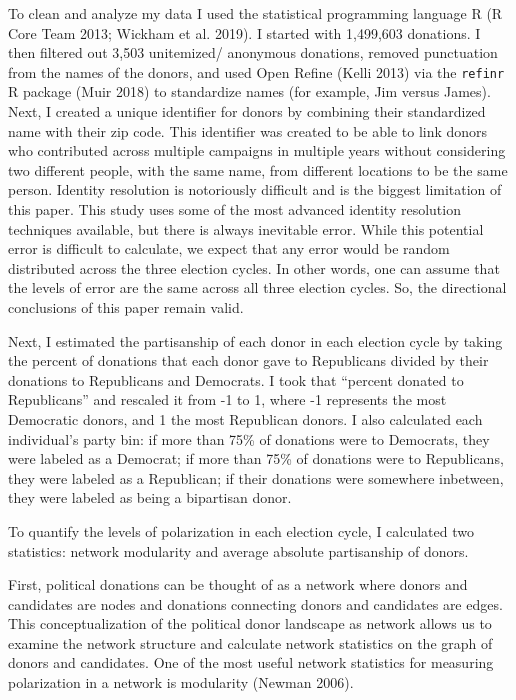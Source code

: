 \documentclass[12pt,]{article}
\begin{document}
To clean and analyze my data I used the statistical programming language
R (R Core Team 2013; Wickham et al. 2019). I started with 1,499,603
donations. I then filtered out 3,503 unitemized/ anonymous donations,
removed punctuation from the names of the donors, and used Open Refine
(Kelli 2013) via the \texttt{refinr} R package (Muir 2018) to
standardize names (for example, Jim versus James). Next, I created a
unique identifier for donors by combining their standardized name with
their zip code. This identifier was created to be able to link donors
who contributed across multiple campaigns in multiple years without
considering two different people, with the same name, from different
locations to be the same person. Identity resolution is notoriously
difficult and is the biggest limitation of this paper. This study uses
some of the most advanced identity resolution techniques available, but
there is always inevitable error. While this potential error is
difficult to calculate, we expect that any error would be random
distributed across the three election cycles. In other words, one can
assume that the levels of error are the same across all three election
cycles. So, the directional conclusions of this paper remain valid.

Next, I estimated the partisanship of each donor in each election cycle
by taking the percent of donations that each donor gave to Republicans
divided by their donations to Republicans and Democrats. I took that
``percent donated to Republicans'' and rescaled it from -1 to 1, where
-1 represents the most Democratic donors, and 1 the most Republican
donors. I also calculated each individual's party bin: if more than 75\%
of donations were to Democrats, they were labeled as a Democrat; if more
than 75\% of donations were to Republicans, they were labeled as a
Republican; if their donations were somewhere inbetween, they were
labeled as being a bipartisan donor.

To quantify the levels of polarization in each election cycle, I
calculated two statistics: network modularity and average absolute
partisanship of donors.

First, political donations can be thought of as a network where donors
and candidates are nodes and donations connecting donors and candidates
are edges. This conceptualization of the political donor landscape as
network allows us to examine the network structure and calculate network
statistics on the graph of donors and candidates. One of the most useful
network statistics for measuring polarization in a network is modularity
(Newman 2006).
\end{document}
